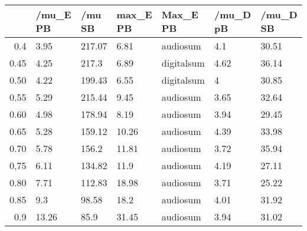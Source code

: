 \begin{table}[ht]
\centering
\begin{tabular}{rllllll}
  \hline
 & /mu\_E PB & /mu SB & max\_E PB & Max\_E PB & /mu\_D pB & /mu\_D SB \\ 
  \hline
0.4 & 3.95 & 217.07 & 6.81 & audiosum & 4.1 & 30.51 \\ 
  0.45 & 4.25 & 217.3 & 6.89 & digitalsum & 4.62 & 36.14 \\ 
  0.50 & 4.22 & 199.43 & 6.55 & digitalsum & 4 & 30.85 \\ 
  0.55 & 5.29 & 215.44 & 9.45 & audiosum & 3.65 & 32.64 \\ 
  0.60 & 4.98 & 178.94 & 8.19 & audiosum & 3.94 & 29.45 \\ 
  0.65 & 5.28 & 159.12 & 10.26 & audiosum & 4.39 & 33.98 \\ 
  0.70 & 5.78 & 156.2 & 11.81 & audiosum & 3.72 & 35.94 \\ 
  0,75 & 6.11 & 134.82 & 11.9 & audiosum & 4.19 & 27.11 \\ 
  0.80 & 7.71 & 112.83 & 18.98 & audiosum & 3.71 & 25.22 \\ 
  0.85 & 9.3 & 98.58 & 18.2 & audiosum & 4.01 & 31.92 \\ 
  0.9 & 13.26 & 85.9 & 31.45 & audiosum & 3.94 & 31.02 \\ 
   \hline
\end{tabular}
\end{table}
